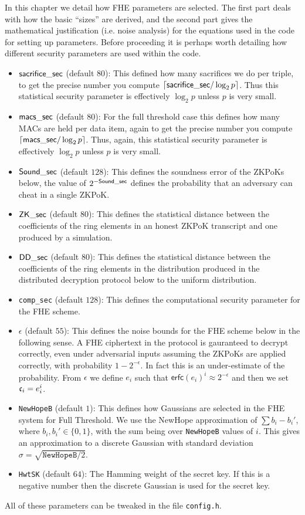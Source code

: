 \label{sec:fhe}
In this chapter we detail how FHE parameters are selected.
The first part deals with how the basic ``sizes'' are derived,
and the second part gives the mathematical justification (i.e.
noise analysis) for the equations used in the code for setting
up parameters.
Before proceeding it is perhaps worth detailing how
different security parameters are used within the code.

\begin{itemize}
\item $\mathsf{sacrifice\_sec}$ (default $80$): 
This defined how many sacrifices we do per triple, 
to get the precise number you compute ${\lceil \mathsf{sacrifice\_sec}/\log_2 p \rceil}$.
Thus this statistical security parameter is effectively
$\log_2 p$ unless $p$ is very small.
\item $\mathsf{macs\_sec}$ (default $80$):
For the full threshold case this defines how many MACs are held
per data item, again to get the precise number you compute 
${\lceil \mathsf{macs\_sec}/\log_2 p \rceil}$.
Thus, again, this statistical security parameter is effectively
$\log_2 p$ unless $p$ is very small.
\item $\mathsf{Sound\_sec}$ (default $128$):
This defines the soundness error of the ZKPoKs below,
the value of $2^{-\mathsf{Sound\_sec}}$ defines the probability
that an adversary can cheat in a single ZKPoK.
\item $\mathsf{ZK\_sec}$ (default $80$): 
This defines the statistical distance between the 
coefficients of the ring elements in an honest ZKPoK
transcript and one produced by a simulation.
\item $\mathsf{DD\_sec}$ (default $80$):
This defines the statistical distance between the 
coefficients of the ring elements in the distribution produced
in the distributed decryption protocol below to the uniform
distribution.
\item \verb+comp_sec+ (default $128$):
This defines the computational security parameter for the
FHE scheme. 
\item $\epsilon$ (default $55$):
This defines the noise bounds for the FHE scheme below in
the following sense.
A FHE ciphertext in the protocol is gauranteed to decrypt
correctly, even under adversarial inputs assuming the
ZKPoKs are applied correctly, with probability $1-2^{-\epsilon}$.
In fact this is an under-estimate of the probability.
From $\epsilon$ we define $e_i$ such that 
$\mathsf{erfc}(e_i)^i \approx 2^{-\epsilon}$ and then we set $\mathfrak{c}_i = e_i^i$.
\item \verb+NewHopeB+ (default $1$):
This defines how Gaussians are selected in the FHE system for
Full Threshold. We use the NewHope approximation of
$\sum b_i - b_i'$, where $b_i, b_i' \in \{0,1\}$,
with the sum being over \verb+NewHopeB+ values of $i$.
This gives an approximation to a discrete Gaussian with
standard deviation $\sigma = \sqrt{\texttt{NewHopeB}/2}$.
\item \verb+HwtSK+ (default $64$):
The Hamming weight of the secret key. If this is a negative
number then the discrete Gaussian is used for the secret key.
\end{itemize}
All of these parameters can be tweaked in the file
\verb+config.h+.

